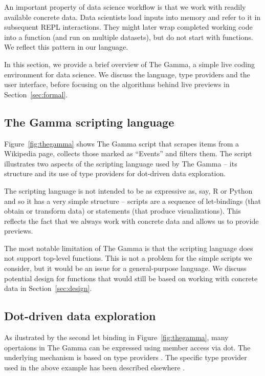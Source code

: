 \documentclass[sigplan,10pt,review,anonymous]{acmart}\settopmatter{printfolios=true,printccs=false,printacmref=false}
\theoremstyle{plain}
\theoremstyle{definition}
\begin{document}
An important property of data science workflow is that we work with readily available concrete data.
Data scientists load inputs into memory and refer to it in subsequent REPL interactions. They might 
later wrap completed working code into a function (and run on multiple datasets), but 
do not start with functions. We reflect this pattern in our language. 

In this section, we provide a brief overview of The Gamma, a simple live coding environment for
data science. We discuss the language, type providers and the user interface,
before focusing on the algorithms behind live previews in Section~\ref{sec:formal}.

\subsection{The Gamma scripting language}
Figure~\ref{fig:thegamma} shows The Gamma script that scrapes items from a Wikipedia page, 
collects those marked as ``Events'' and filters them. The script illustrates two aspects of the
scripting language used by The Gamma -- its structure and its use of type providers for
dot-driven data exploration.

The scripting language is not intended to be as expressive as, say, R or Python and so it
has a very simple structure -- scripts are a sequence of let-bindings (that obtain or transform 
data) or statements (that produce visualizations). This reflects the fact that we always work
with concrete data and allows us to provide previews.

The most notable limitation of The Gamma is that the scripting language does not support top-level 
functions. This is not a problem for the simple scripts we consider, but it would be an issue for
a general-purpose language. We discuss potential design for functions that would still be based
on working with concrete data in Section~\ref{sec:design}.

\subsection{Dot-driven data exploration}

As ilustrated by the second let binding in Figure~\ref{fig:thegamma}, many opertaions
in The Gamma can be expressed using member access via dot. The underlying mechanism is based
on type providers \cite{providers-fsharp,providers-idris}. The specific type provider used in 
the above example has been described elsewhere \cite{gamma}.
\end{document}
